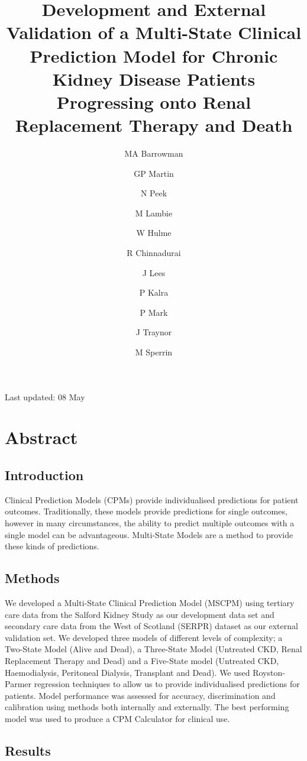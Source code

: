 \documentclass[
]{article}
\title{Development and External Validation of a Multi-State Clinical Prediction Model for Chronic Kidney Disease Patients Progressing onto Renal Replacement Therapy and Death}
\author{MA Barrowman \and GP Martin \and N Peek \and M Lambie \and W Hulme \and R Chinnadurai \and J Lees \and P Kalra \and P Mark \and J Traynor \and M Sperrin}
\date{}
\begin{document}
\maketitle

{
\setcounter{tocdepth}{2}
\tableofcontents
}
Last updated: 08 May

\hypertarget{abstract}{%
\section*{Abstract}\label{abstract}}

\hypertarget{introduction}{%
\subsection*{Introduction}\label{introduction}}

Clinical Prediction Models (CPMs) provide individualised predictions for patient outcomes. Traditionally, these models provide predictions for single outcomes, however in many circumstances, the ability to predict multiple outcomes with a single model can be advantageous. Multi-State Models are a method to provide these kinds of predictions.

\hypertarget{methods}{%
\subsection*{Methods}\label{methods}}

We developed a Multi-State Clinical Prediction Model (MSCPM) using tertiary care data from the Salford Kidney Study as our development data set and secondary care data from the West of Scotland (SERPR) dataset as our external validation set. We developed three models of different levels of complexity; a Two-State Model (Alive and Dead), a Three-State Model (Untreated CKD, Renal Replacement Therapy and Dead) and a Five-State model (Untreated CKD, Haemodialysis, Peritoneal Dialysis, Transplant and Dead). We used Royston-Parmer regression techniques to allow us to provide individualised predictions for patients. Model performance was assessed for accuracy, discrimination and calibration using methods both internally and externally. The best performing model was used to produce a CPM Calculator for clinical use.

\hypertarget{results}{%
\subsection*{Results}\label{results}}
\end{document}
